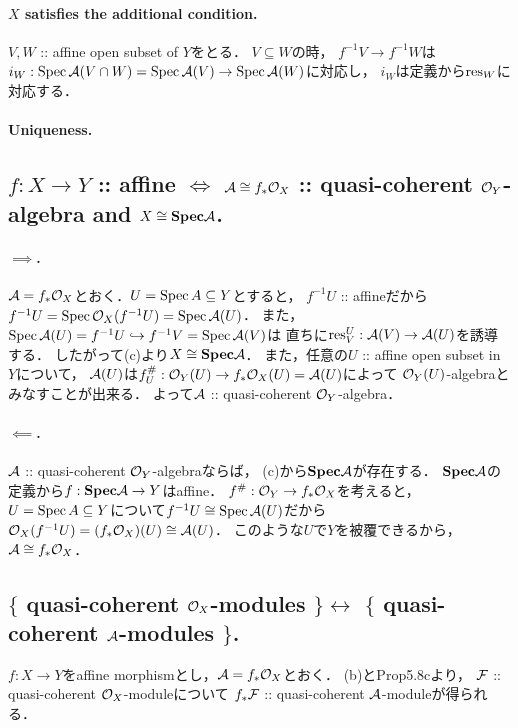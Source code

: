 \documentclass[a4paper]{jsarticle}
\newcommand{\bfSpec}{\mathbf{Spec}}
\begin{document}
    \paragraph{$X$ satisfies the additional condition.}
    $V, W$ :: affine open subset of $Y$をとる．
    $V \subseteq W$の時，
    $f^{-1}V \to f^{-1}W$は$i_W: \operatorname{Spec} \mathcal{A}(V \cap W)=\operatorname{Spec} \mathcal{A}(V) \to \operatorname{Spec} \mathcal{A}(W)$に対応し，
    $i_W$は定義から$\operatorname{res}_W$に対応する．

    \paragraph{Uniqueness.}

    \subsection{$f: X \to Y$ :: affine $\iff$
        $\mathcal{A} \cong f_* \mathcal{O}_X$ :: quasi-coherent $\mathcal{O}_Y$-algebra and $X \iso \bfSpec \shA$.}

    \paragraph{$\implies$.}
    $\mathcal{A}=f_* \mathcal{O}_X$とおく．$U=\operatorname{Spec} A \subseteq Y$とすると，
    $f^{-1}U$ :: affineだから$f^{-1}U=\operatorname{Spec} \mathcal{O}_X(f^{-1}U)=\operatorname{Spec} \mathcal{A}(U)$．
    また，$\operatorname{Spec} \mathcal{A}(U)=f^{-1}U \hookrightarrow f^{-1}V=\operatorname{Spec} \mathcal{A}(V)$は
    直ちに$\operatorname{res}_V^U: \mathcal{A}(V) \to \mathcal{A}(U)$を誘導する．
    したがって(c)より$X \iso \bfSpec \shA$．
    また，任意の$U$ :: affine open subset in $Y$について，
    $\mathcal{A}(U)$は$f^{\#}_U: \mathcal{O}_Y(U) \to f_*\mathcal{O}_X(U)=\mathcal{A}(U)$によって
    $\mathcal{O}_Y(U)$-algebraとみなすことが出来る．
    よって$\mathcal{A}$ :: quasi-coherent $\mathcal{O}_Y$-algebra．

    \paragraph{$\impliedby$.}
    $\mathcal{A}$ :: quasi-coherent $\mathcal{O}_Y$-algebraならば，
    (c)から$\bfSpec \shA$が存在する．
    $\bfSpec \shA$の定義から$f: \bfSpec \shA \to Y$はaffine．
    $f^{\#}: \mathcal{O}_Y \to f_*\mathcal{O}_X$を考えると，
    $U=\operatorname{Spec} A \subseteq Y$について$f^{-1}U \cong \operatorname{Spec} \mathcal{A}(U)$だから
    $\mathcal{O}_X(f^{-1}U)=(f_*\mathcal{O}_X)(U) \cong \mathcal{A}(U)$．
    このような$U$で$Y$を被覆できるから，$\mathcal{A} \cong f_*\mathcal{O}_X$．

    \subsection{$\{$ quasi-coherent $\mathcal{O}_X$-modules $\} \leftrightarrow$ $\{$ quasi-coherent $\mathcal{A}$-modules $\}$.}
    $f: X \to Y$をaffine morphismとし，$\mathcal{A}=f_*\mathcal{O}_X$とおく．
    (b)とProp5.8cより，
    $\mathcal{F}$ :: quasi-coherent $\mathcal{O}_X$-moduleについて
    $f_* \mathcal{F}$ :: quasi-coherent $\mathcal{A}$-moduleが得られる．
\end{document}
